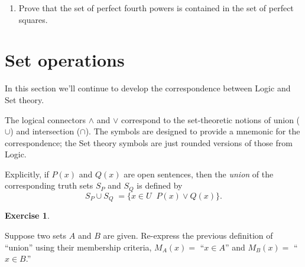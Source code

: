 \documentclass[10pt,]{book}
\theoremstyle{plain}
\theoremstyle{definition}
\theoremstyle{definition}
\newtheorem{exercise}[theorem]{Exercise}
\numberwithin{equation}{section}
\newcommand{\hint}[1]{ }
\newcommand{\suchthat}{\;  \;}
\newcommand{\Integers}{{\mathbb Z}}
\begin{document}
\begin{enumerate}[label=(\alph*)]
          \hint{The smallest example I can think of would be \(A=\emptyset\) and \(B=\{\emptyset\}\).  You should come up with a different example.}
\item\hypertarget{li-310}{}
          Prove that the set of perfect fourth powers is contained in the
          set of perfect squares.

          \hint{It would probably be helpful to have precise definitions of the sets described in the problem.

          The fourth powers are
          \begin{equation*}
            F = \{x \suchthat \exists y \in \Integers, x=y^4 \}.
          \end{equation*}
          The squares are
          \begin{equation*}
            S = \{x \suchthat \exists z \in \Integers, x=z^2 \}.
          \end{equation*}
          To show that one set is contained in another, we need to show that the first set's membership
          criterion implies that of the second set.}
\end{enumerate}
\typeout{************************************************}
\typeout{************************************************}
\section[{Set operations}]{Set operations}\label{section-23}

    In this section we'll continue to develop the correspondence between
    Logic and Set theory.
\par

    The logical connectors \(\land\) and \(\lor\) correspond to the set-theoretic
    notions of
    union (\(\cup\)) and
    intersection (\(\cap\)). The symbols are
    designed to provide a mnemonic for the correspondence; the Set theory
    symbols are just rounded versions of those from Logic.
\par

    Explicitly, if \(P(x)\) and \(Q(x)\) are open sentences, then
    the \emph{union} of the corresponding truth sets \(S_P\) and \(S_Q\)
    is defined by
    \begin{equation*}
      S_P \cup S_Q \; = \{ x \in U \suchthat P(x) \lor Q(x) \}.
    \end{equation*}
\begin{exercise}\label{exercise-35}

        Suppose two sets \(A\) and \(B\) are given. Re-express the previous
        definition of ``union'' using their membership criteria, \(M_A(x) =\)
        ``\(x \in A\)'' and \(M_B(x) =\) ``\(x \in B\).''
\end{exercise}
\par
\end{document}
